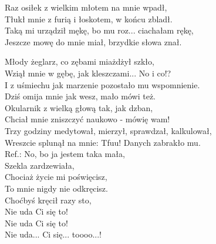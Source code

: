 Raz osiłek z wielkim młotem na mnie wpadł, \\
Tłukł mnie z furią i łoskotem, w końcu zbladł. \\
Taką mi urządził mękę, bo mu roz... ciachałam rękę, \\
Jeszcze mowę do mnie miał, brzydkie słowa znał. \\
\newpage

Młody żeglarz, co zębami miażdżył szkło, \\
Wziął mnie w gębę, jak kleszczami... No i co!? \\
I z uśmiechu jak marzenie pozostało mu wspomnienie. \\
Dziś omija mnie jak wesz, mało mówi też. \\

Okularnik z wielką głową tak, jak dzban, \\
Chciał mnie zniszczyć naukowo - mówię wam! \\
Trzy godziny medytował, mierzył, sprawdzał, kalkulował, \\
Wreszcie splunął na mnie: Tfuu! Danych zabrakło mu. \\

Ref.: No, bo ja jestem taka mała, \\
Szekla zardzewiała, \\
Chociaż życie mi poświęcisz, \\
To mnie nigdy nie odkręcisz. \\
Choćbyś kręcił razy sto, \\
Nie uda Ci się to! \\
Nie uda Ci się to! \\
Nie uda... Ci się... toooo...!